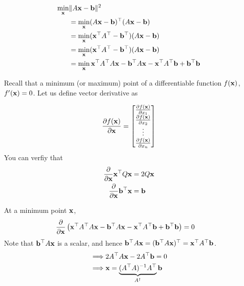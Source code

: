 \documentclass{article}
\begin{document}
\begin{align}
  \min_{\mathbf{x}} &\|A\mathbf{x} - \mathbf{b}\|^2
  \\
              &= \min_{\mathbf{x}} (A\mathbf{x} - \mathbf{b})^\top (A\mathbf{x} - \mathbf{b})
  \\
              &= \min_{\mathbf{x}} (\mathbf{x}^\top A^\top - \mathbf{b}^\top) (A\mathbf{x} - \mathbf{b})
  \\
              &= \min_{\mathbf{x}} (\mathbf{x}^\top A^\top - \mathbf{b}^\top) (A\mathbf{x} - \mathbf{b})
  \\
              &= \min_{\mathbf{x}} \mathbf{x}^\top A^\top A\mathbf{x} - \mathbf{b}^\top A\mathbf{x} - \mathbf{x}^\top A^\top \mathbf{b} + \mathbf{b}^\top \mathbf{b}
\end{align}

Recall that a minimum (or maximum) point of a differentiable function $f(\mathbf{x})$,
$f'(\mathbf{x})  = 0$. Let us define vector derivative as

\begin{align}
  \frac{\partial f(\mathbf{x})}{\partial \mathbf{x}} = \begin{bmatrix}
    \frac{\partial f(\mathbf{x})}{\partial x_1}
    \\
    \frac{\partial f(\mathbf{x})}{\partial x_2}
    \\
    \vdots
    \\
    \frac{\partial f(\mathbf{x})}{\partial x_n}
  \end{bmatrix}
\end{align}
You can verfiy that
\begin{align}
  \frac{\partial }{\partial \mathbf{x}} \mathbf{x}^\top Q \mathbf{x} &= 2 Q\mathbf{x}
  \\
  \frac{\partial }{\partial \mathbf{x}} \mathbf{b}^\top \mathbf{x} &= \mathbf{b}
\end{align}

At a minimum point $\mathbf{x}$,
%
\begin{align}
  &\frac{\partial }{\partial \mathbf{x}} \left(\mathbf{x}^\top A^\top A\mathbf{x} - \mathbf{b}^\top A\mathbf{x} - \mathbf{x}^\top A^\top \mathbf{b} + \mathbf{b}^\top \mathbf{b}\right) = 0
\end{align}
%
Note that  $\mathbf{b}^\top A\mathbf{x}$ is a scalar, and hence $\mathbf{b}^\top A\mathbf{x} =
(\mathbf{b}^\top A\mathbf{x})^\top = \mathbf{x}^\top A^\top \mathbf{b}$.
%
\begin{align}
  \implies & 2A^\top A\mathbf{x} - 2 A^\top \mathbf{b} = 0
  \\
  \implies & \mathbf{x} = \underbrace{(A^\top A)^{-1} A^\top}_{A^\dagger} \mathbf{b}
\end{align}

\listoftheorems[ignoreall,show={defn}]
\end{document}
